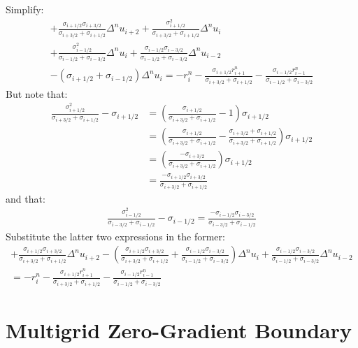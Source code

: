 \documentclass{warpdoc}
\begin{document}
%
Simplify:
%
\begin{align}
    + \frac{\sigma_{i+1/2} \sigma_{i+3/2}}{\sigma_{i+3/2}+\sigma_{i+1/2}} \Delta^n u_{i+2} + \frac{\sigma_{i+1/2}^2}{\sigma_{i+3/2}+\sigma_{i+1/2}}\Delta^n u_{i}  \nonumber\\
  + \frac{\sigma_{i-1/2}^2}{\sigma_{i-1/2}+\sigma_{i-3/2}} \Delta^n u_{i}  + \frac{\sigma_{i-1/2}\sigma_{i-3/2}}{\sigma_{i-1/2}+\sigma_{i-3/2}}\Delta^n u_{i-2}\nonumber\\
 - (\sigma_{i+1/2}+\sigma_{i-1/2}) \Delta^n u_{i} 
      = -r_{i}^n - \frac{\sigma_{i+1/2} r_{i+1}^n}{\sigma_{i+3/2}+\sigma_{i+1/2}}  -  \frac{\sigma_{i-1/2} r_{i-1}^n}{\sigma_{i-1/2}+\sigma_{i-3/2}} 
\label{eqn:mg1D6}
\end{align}
%
But note that:
%
\begin{align}
\frac{\sigma_{i+1/2}^2}{\sigma_{i+3/2}+\sigma_{i+1/2}} - \sigma_{i+1/2} &= \left(\frac{\sigma_{i+1/2}}{\sigma_{i+3/2}+\sigma_{i+1/2}}  -1 \right) \sigma_{i+1/2} \nonumber\\
        &= \left(\frac{\sigma_{i+1/2}}{\sigma_{i+3/2}+\sigma_{i+1/2}}  -\frac{{\sigma_{i+3/2}+\sigma_{i+1/2}}}{{\sigma_{i+3/2}+\sigma_{i+1/2}}} \right) \sigma_{i+1/2} \nonumber\\
        &= \left(\frac{-\sigma_{i+3/2}}{\sigma_{i+3/2}+\sigma_{i+1/2}}  \right) \sigma_{i+1/2} \nonumber\\
        &= \frac{-\sigma_{i+1/2}\sigma_{i+3/2}}{\sigma_{i+3/2}+\sigma_{i+1/2}}   
\end{align}
%
and that:
%
\begin{align}
\frac{\sigma_{i-1/2}^2}{\sigma_{i-3/2}+\sigma_{i-1/2}} - \sigma_{i-1/2} = \frac{-\sigma_{i-1/2}\sigma_{i-3/2}}{\sigma_{i-3/2}+\sigma_{i-1/2}}   
\end{align}
%
Substitute the latter two expressions in the former:
%
\begin{align}
    + \frac{\sigma_{i+1/2} \sigma_{i+3/2}}{\sigma_{i+3/2}+\sigma_{i+1/2}} \Delta^n u_{i+2} 
  - \left( \frac{\sigma_{i+1/2}\sigma_{i+3/2}}{\sigma_{i+3/2}+\sigma_{i+1/2}} +\frac{\sigma_{i-1/2}\sigma_{i-3/2}}{\sigma_{i-1/2}+\sigma_{i-3/2}}\right)\Delta^n u_{i}  
+ \frac{\sigma_{i-1/2}\sigma_{i-3/2}}{\sigma_{i-1/2}+\sigma_{i-3/2}}\Delta^n u_{i-2}\nonumber\\
      = -r_{i}^n - \frac{\sigma_{i+1/2} r_{i+1}^n}{\sigma_{i+3/2}+\sigma_{i+1/2}}  -  \frac{\sigma_{i-1/2} r_{i-1}^n}{\sigma_{i-1/2}+\sigma_{i-3/2}} 
\label{eqn:mg1D7}
\end{align}
%

\section{Multigrid Zero-Gradient Boundary}
\end{document}
